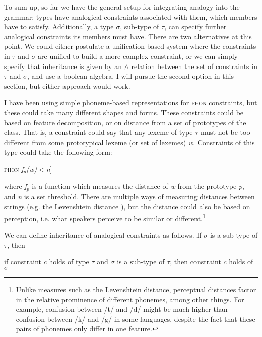 To sum up, so far we have the general setup for integrating analogy into the grammar: types have analogical constraints associated with them, which members have to satisfy. Additionally, a type $\sigma$, sub-type of $\tau$, can specify further analogical constraints its members must have. There are two alternatives at this point. We could either postulate a unification-based system where the constraints in $\tau$ and $\sigma$ are unified to build a more complex constraint, or we can simply specify that inheritance is given by an $\land$ relation between the set of constraints in $\tau$ and $\sigma$, and use a boolean algebra. I will pursue the second option in this section, but either approach would work.

I have been using simple phoneme-based representations for \textsc{phon} constraints, but these could take many different shapes and forms. These constraints could be based on feature decomposition, or on distance from a set of prototypes of the class. That is, a constraint could say that any lexeme of type $\tau$ must not be too different from some prototypical lexeme (or set of lexemes) \textit{w}. Constraints of this type could take the following form:

\begin{exe}
    \ex {[}\textsc{phon} \textit{f$_p$(w)}$<$\textit{n}{]}
\end{exe}

\noindent
where \textit{f$_p$} is a function which measures the distance of \textit{w} from the prototype \textit{p}, and \textit{n} is a set threshold. There are multiple ways of measuring distances between strings (e.g. the Levenshtein distance \citealt{Levenshtein.1966}), but the distance  could also be based on perception, i.e. what speakers perceive to be similar or different.\footnote{Unlike measures such as the Levenshtein distance, perceptual distances factor in the relative prominence of different phonemes, among other things. For example, confusion between /t/ and /d/ might be much higher than confusion between /k/ and /g/ in some languages, despite the fact that these pairs of phonemes only differ in one feature.}

We can define inheritance of analogical constraints as follows. If $\sigma$ is a sub-type of $\tau$, then

\begin{exe}
    \ex if constraint $c$ holds of type $\tau$ and $\sigma$ is a sub-type of $\tau$, then constraint $c$ holds of $\sigma$
\end{exe}


